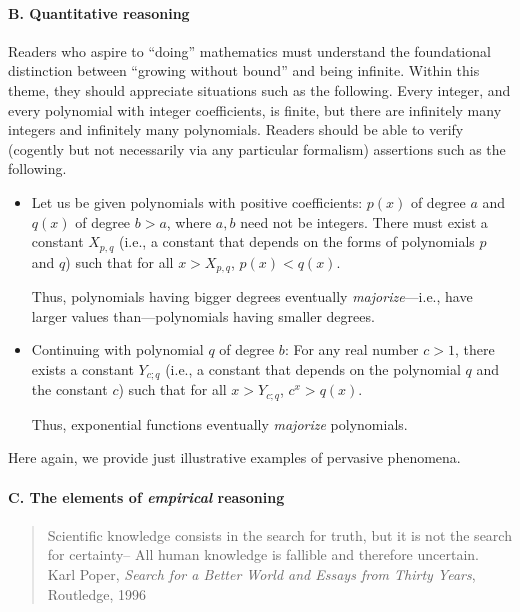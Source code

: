 \paragraph{B. Quantitative reasoning}

Readers who aspire to ``doing'' mathematics must understand the foundational distinction between ``growing without bound'' and being infinite.  Within this theme, they should appreciate situations such as the following.  Every integer, and every polynomial with integer coefficients, is finite, but there are infinitely many integers and infinitely many polynomials.  Readers should be able to verify (cogently but not necessarily via any particular formalism) assertions such as the following.
\begin{itemize}
\item
Let us be given polynomials with positive coefficients: $p(x)$ of degree $a$ and $q(x)$ of degree $b > a$, where $a, b$ need not be integers.  There must exist a constant $X_{p,q}$ (i.e., a constant that depends on the forms of polynomials $p$ and $q$) such that for all $x > X_{p,q}$, $p(x) < q(x)$.


\smallskip

Thus, polynomials having bigger degrees eventually {\em majorize}---i.e., have larger values than---polynomials having smaller degrees.

\medskip\item
Continuing with polynomial $q$ of degree $b$: For any real number $c > 1$, there exists a constant $Y_{c;q}$ (i.e., a constant that depends on the polynomial $q$ and the constant $c$) such that for all $x > Y_{c;q}$, $c^x > q(x)$.

\smallskip

Thus, exponential functions eventually {\em majorize} polynomials.
\end{itemize}
Here again, we provide just illustrative examples of pervasive phenomena.

\paragraph{C. The elements of {\em empirical} reasoning}

\begin{quote}
Scientific knowledge consists in the search for truth, but it is not the search for certainty-- All human knowledge is fallible and therefore uncertain. \\
\hspace*{.2in}Karl Poper, {\it Search for a Better World and Essays from Thirty Years}, Routledge, 1996
\end{quote}

